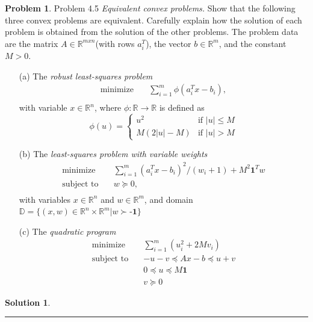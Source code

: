 \documentclass{article}
\theoremstyle{definition}
\newtheorem{problem}{Problem}
\def\fline{\rule{0.75\linewidth}{0.5pt}}
\newcommand{\finishline}{\begin{center}\fline\end{center}}
\newtheorem*{solution*}{Solution}
\newenvironment{solution}{\begin{solution*}}{{\finishline} \end{solution*}}
\begin{document}
\begin{problem} Problem 4.5
    \textit{Equivalent convex problems.} Show that the following three convex problems are equivalent. Carefully explain how the solution of each problem is obtained from the solution of the other problems. The problem data are the matrix $A \in \mathbb{R}^{m x n}$(with rows $a_i^T$), the vector $b \in \mathbb{R}^m$, and the constant $M > 0$.
    \begin{itemize}
        \item[(a)] The \textit{robust least-squares problem}
        \begin{align*}
\text{minimize} \quad & \sum_{i=1}^{m} \phi(a_i^T x - b_i), \\
\end{align*}
with variable $x \in \mathbb{R}^n$, where $\phi: \mathbb{R} \rightarrow \mathbb{R}$ is defined as 
\begin{equation}
    \phi(u) = \begin{cases} 
      u^2 & \text{if } |u| \leq M \\
      M(2|u| - M) & \text{if } |u| > M 
   \end{cases}
\end{equation}

        \item[(b)] The \textit{least-squares problem with variable weights}
 \begin{align*}
\text{minimize} \quad & \sum_{i=1}^{m} (a_i^T x - b_i)^2/(w_i + 1) + M^2\textbf{1}^Tw \\
\text{subject to} \quad & w \succeq 0,\\
\end{align*}
with variables $x \in \mathbb{R}^n$ and $w \in \mathbb{R}^m$, and domain $\mathbb{D} = \{(x, w) \in \mathbb{R}^n \times \mathbb{R}^m | w \succ \textbf{-1} \}$

        \item[(c)] The \textit{quadratic program}
        \begin{align*}
\text{minimize} \quad & \sum_{i=1}^{m} (u_i^2 + 2Mv_i) \\
\text{subject to} \quad & -u - v \preceq Ax - b \preceq u + v\\
\quad & 0 \preceq u \preceq M\textbf{1}\\
& v \succeq 0
\end{align*}
    \end{itemize}

\begin{solution}


\end{solution}
\end{problem}
\end{document}
